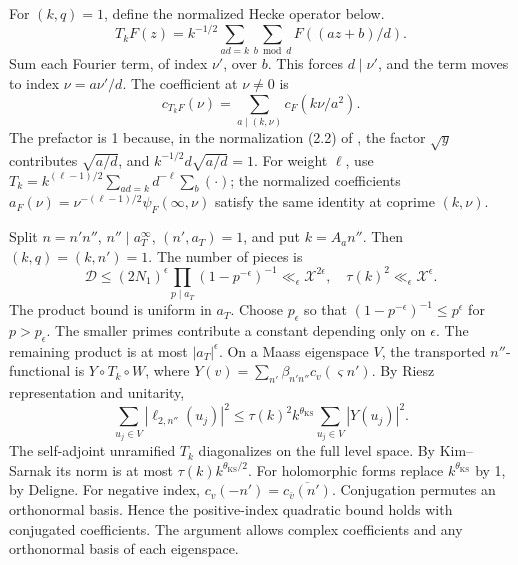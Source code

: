 For $(k,q)=1$, define the normalized Hecke operator below.
\[
T_kF(z)=k^{-1/2}\sum_{ad=k}\sum_{b\bmod d}F((az+b)/d).
\tag{2.7.T37}\label{p1:eq:2.7.T37}
\]
Sum each Fourier term, of index $\nu'$, over $b$. This forces
$d\mid\nu'$, and the term moves to index $\nu=a\nu'/d$. The
coefficient at $\nu\ne0$ is
\[
c_{T_kF}(\nu)=\sum_{a\mid(k,\nu)}c_F(k\nu/a^2).
\tag{2.7.T38}\label{p1:eq:2.7.T38}
\]
The prefactor is 1 because, in the normalization (2.2) of
\cite[(1.15)]{DI82}, the factor $\sqrt y$ contributes $\sqrt{a/d}$,
and $k^{-1/2}d\sqrt{a/d}=1$.
For weight $\ell$, use
$T_k=k^{(\ell-1)/2}\sum_{ad=k}d^{-\ell}\sum_b(\cdot)$;
the normalized coefficients
$a_F(\nu)=\nu^{-(\ell-1)/2}\psi_F(\infty,\nu)$
satisfy the same identity at coprime $(k,\nu)$.

Split $n=n'n''$, $n''\mid a_T^\infty$, $(n',a_T)=1$,
and put $k=A_an''$. Then $(k,q)=(k,n')=1$.
The number of pieces is
\[
\mathcal D\le(2N_1)^\epsilon
                  \prod_{p\mid a_T}(1-p^{-\epsilon})^{-1}
 \ll_\epsilon\mathcal X^{2\epsilon},
\quad \tau(k)^2\ll_\epsilon\mathcal X^\epsilon.
\tag{2.7.T39}\label{p1:eq:2.7.T39}
\]
The product bound is uniform in $a_T$. Choose $p_\epsilon$ so that $(1-p^{-\epsilon})^{-1}\leq p^\epsilon$ for $p>p_\epsilon$. The smaller primes contribute a constant depending only on $\epsilon$. The remaining product is at most $|a_T|^\epsilon$.
On a Maass eigenspace $V$, the transported $n''$-functional is
$Y\circ T_k\circ W$, where
$Y(v)=\sum_{n'}\beta_{n'n''}c_v(\varsigma n')$.
By Riesz representation and unitarity,
\[
\sum_{u_j\in V}|\ell_{2,n''}(u_j)|^2
 \le\tau(k)^2k^{\theta_{\mathrm{KS}}}\sum_{u_j\in V}|Y(u_j)|^2.
\tag{2.7.T40}\label{p1:eq:2.7.T40}
\]
The self-adjoint unramified $T_k$ diagonalizes on the full
level space. By Kim--Sarnak its norm is at most
$\tau(k)k^{\theta_{\mathrm{KS}}/2}$. For holomorphic forms replace $k^{\theta_{\mathrm{KS}}}$
by 1, by Deligne. For negative index, $c_v(-n')=\overline{c_{\bar v}(n')}$. Conjugation permutes an orthonormal basis. Hence the positive-index quadratic bound holds with conjugated coefficients. The argument allows complex
coefficients and any orthonormal basis of each eigenspace.

